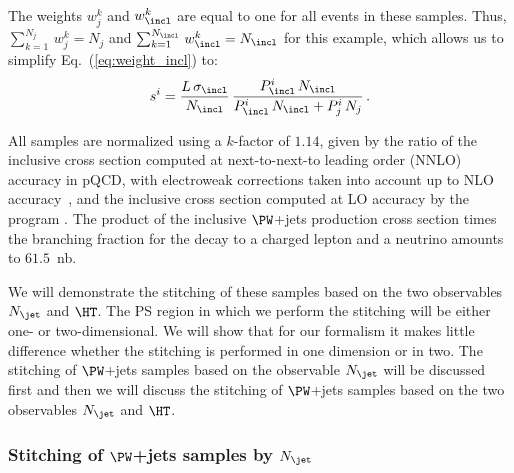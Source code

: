The weights $w_{j}^{k}$ and $w_{\incl}^{k}$ are equal to one for all events in these samples.
Thus, $\sum_{k=1}^{N_{j}} \, w_{j}^{k} = N_{j}$ and $\sum_{k=1}^{N_{\incl}} \, w_{\incl}^{k} = N_{\incl}$ for this example,
which allows us to simplify Eq.~(\ref{eq:weight_incl}) to:
\begin{equation}
s^{i} = \frac{L \, \sigma_{\incl}}{N_{\incl}} \, \frac{P_{\incl}^{i} \, N_{\incl}}{P_{\incl}^{i} \, N_{\incl} + P_{j}^{i} \, N_{j}} \, .
\label{eq:weight_incl_simplified}
\end{equation}

All samples are normalized using a $k$-factor of $1.14$, given by the ratio of the inclusive cross section computed at next-to-next-to leading order (NNLO) accuracy in pQCD,
with electroweak corrections taken into account up to NLO accuracy~\cite{Li:2012wna},
and the inclusive cross section computed at LO accuracy by the program \MGvATNLO.
The product of the inclusive $\PW$+jets production cross section times the branching fraction for the decay to a charged lepton and a neutrino amounts to $61.5$~nb.

We will demonstrate the stitching of these samples based on the two observables $N_{\jet}$ and $\HT$.
The PS region in which we perform the stitching will be either one- or two-dimensional.
We will show that for our formalism
it makes little difference whether the stitching is performed in one dimension or in two.
The stitching of $\PW$+jets samples based on the observable $N_{\jet}$ will be discussed first
and then we will discuss the stitching of $\PW$+jets samples based on the two observables $N_{\jet}$ and $\HT$.


\subsubsection{Stitching of \texorpdfstring{$\PW$}{W}+jets samples by \texorpdfstring{$N_{\jet}$}{Njet}}
\label{sec:WJets_vs_Njet}

